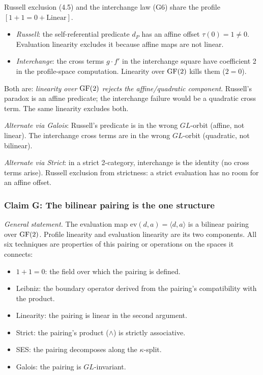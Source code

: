 Russell exclusion (4.5) and the interchange law (G6)
share the profile $[1{+}1{=}0 + \mathrm{Linear}]$.

\begin{itemize}[nosep]
  \item \emph{Russell}: the self-referential predicate
    $d_P$ has an affine offset $\tau(0) = 1 \neq 0$.
    Evaluation linearity excludes it because affine
    maps are not linear.
  \item \emph{Interchange}: the cross terms
    $g \cdot f'$ in the interchange square have
    coefficient 2 in the profile-space computation.
    Linearity over $\operatorname{GF}(2)$ kills them ($2 = 0$).
\end{itemize}

Both are: \emph{linearity over $\operatorname{GF}(2)$ rejects the
affine/quadratic component}. Russell's paradox is an
affine predicate; the interchange failure would be a
quadratic cross term. The same linearity excludes both.

\emph{Alternate via Galois}: Russell's predicate is in
the wrong $GL$-orbit (affine, not linear). The
interchange cross terms are in the wrong $GL$-orbit
(quadratic, not bilinear).

\emph{Alternate via Strict}: in a strict 2-category,
interchange is the identity (no cross terms arise).
Russell exclusion from strictness: a strict evaluation
has no room for an affine offset.

\subsubsection*{Claim G: The bilinear pairing is the
  one structure}

\emph{General statement.}
The evaluation map $\mathrm{ev}(d, a) = \langle d, a
\rangle$ is a bilinear pairing over $\operatorname{GF}(2)$. Profile
linearity and evaluation linearity are its two
components. All six techniques are properties of this
pairing or operations on the spaces it connects:
\begin{itemize}[nosep]
  \item $1{+}1{=}0$: the field over which the pairing
    is defined.
  \item Leibniz: the boundary operator derived from the
    pairing's compatibility with the product.
  \item Linearity: the pairing is linear in the second
    argument.
  \item Strict: the pairing's product ($\wedge$) is
    strictly associative.
  \item SES: the pairing decomposes along the
    $\kappa$-split.
  \item Galois: the pairing is $GL$-invariant.
\end{itemize}


